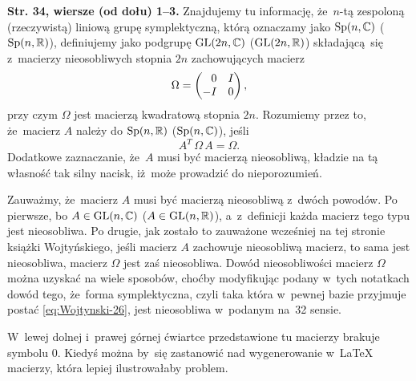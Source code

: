\documentclass[a4paper,11pt]{article}
\begin{document}
\start \textbf{Str. 34, wiersze (od dołu) 1--3.} Znajdujemy tu informację,
że~$n$-tą zespoloną (rzeczywistą) liniową grupę symplektyczną, którą
oznaczamy jako $\mathrm{Sp}( n, \mathbb{C} )$ ($\mathrm{Sp}( n, \mathbb{R} )$), definiujemy
jako podgrupę $\mathrm{GL}( 2n, \mathbb{C} )$ ($\mathrm{GL}( 2n, \mathbb{R} )$) składającą~się
z~macierzy nieosobliwych stopnia $2n$ zachowujących macierz
\begin{equation}
  \label{eq:Wojtynski-28}
  \Omega =
  \begin{pmatrix}
    \hphantom{-} 0 & I \\
    -I & 0
  \end{pmatrix},
\end{equation}
przy czym $\Omega$ jest macierzą kwadratową stopnia $2n$. Rozumiemy przez to,
że~macierz $A$ należy do $\mathrm{Sp}( n, \mathbb{R} )$ ($\mathrm{Sp}( n, \mathbb{C} )$), jeśli
\begin{equation}
  \label{eq:Wojtynski-29}
  A^{ T } \, \Omega \, A = \Omega.
\end{equation}
Dodatkowe zaznaczanie, że~$A$ musi być macierzą nieosobliwą, kładzie na tą
własność tak silny nacisk, iż~może prowadzić do nieporozumień.

Zauważmy, że~macierz $A$ musi być macierzą nieosobliwą z~dwóch powodów. Po
pierwsze, bo $A \in \mathrm{GL}( n, \mathbb{C})$ ($A \in \mathrm{GL}( n, \mathbb{R} )$), a~z~definicji
każda macierz tego typu jest nieosobliwa. Po drugie, jak zostało to
zauważone wcześniej na tej stronie książki Wojtyńskiego, jeśli macierz $A$
zachowuje nieosobliwą macierz, to sama jest nieosobliwa, macierz $\Omega$ jest
zaś nieosobliwa. Dowód nieosobliwości macierz $\Omega$ można uzyskać na wiele
sposobów, choćby modyfikując podany w~tych notatkach dowód tego, że~forma
symplektyczna, czyli taka która w~pewnej bazie przyjmuje postać
\eqref{eq:Wojtynski-26}, jest nieosobliwa w~podanym na~32 sensie.

\vspace{\spaceFour}





\start {} W~lewej dolnej i~prawej górnej ćwiartce przedstawione tu
macierzy brakuje symbolu $0$. Kiedyś można by~się zastanowić nad
wygenerowanie w~\LaTeX{} macierzy, która lepiej ilustrowałaby problem.

\vspace{\spaceFour}
\end{document}
